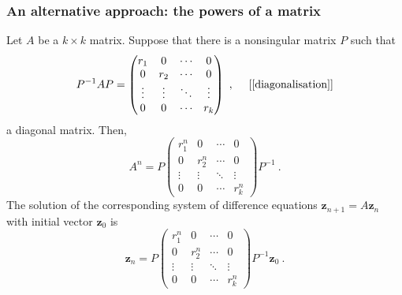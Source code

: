 \documentclass[10pt, handout]{beamer}
\begin{document}
\begin{frame}
\frametitle{\large An alternative approach: the powers of a matrix}
\begin{theorem}[23.7]\footnotesize
Let $A$ be a $k \times k$ matrix. Suppose that there is a nonsingular matrix $P$ such that 
\begin{equation}\nonumber
P^{-1}A{P} = \begin{pmatrix}
r_1 & 0 & \cdots & 0 \\
0 & r_2 & \cdots & 0 \\
\vdots & \vdots & \ddots & \vdots \\
0 & 0 & \cdots & r_k
\end{pmatrix} ~, ~~~~ {\text{[\eqref{diagonalisation}]}}
\end{equation}
a diagonal matrix. Then, 
\begin{equation}\nonumber
A^{n} = {P}\begin{pmatrix}
r_1^n & 0 & \cdots & 0 \\
0 & r_2^n & \cdots & 0 \\
\vdots & \vdots & \ddots & \vdots \\
0 & 0 & \cdots & r_k^n
\end{pmatrix}P^{-1} ~.
\end{equation}
The solution of the corresponding system of difference equations $\mathbf{z}_{n+1} = A\mathbf{z}_n$ with initial vector $\mathbf{z}_0$ is 
\begin{equation}\nonumber
\mathbf{z}_{n} = {P}\begin{pmatrix}
r_1^n & 0 & \cdots & 0 \\
0 & r_2^n & \cdots & 0 \\
\vdots & \vdots & \ddots & \vdots \\
0 & 0 & \cdots & r_k^n
\end{pmatrix}P^{-1}\mathbf{z}_{0} ~.
\end{equation}
\end{theorem} 

\end{frame}
\end{document}
